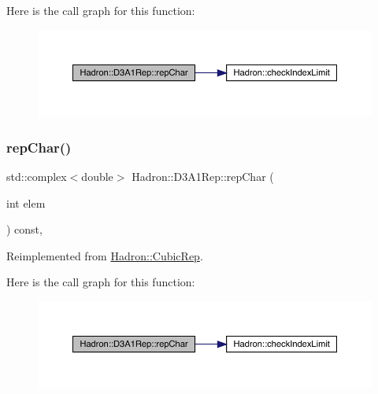 Here is the call graph for this function\+:
\nopagebreak
\begin{figure}[H]
\begin{center}
\leavevmode
\includegraphics[width=350pt]{d4/df6/structHadron_1_1D3A1Rep_aa169675bc42e174827e727a1f3571227_cgraph}
\end{center}
\end{figure}
\mbox{\label{structHadron_1_1D3A1Rep_aa169675bc42e174827e727a1f3571227}} 
\subsubsection{\texorpdfstring{repChar()}{repChar()}\hspace{0.1cm}{\footnotesize\ttfamily [2/2]}}
{\footnotesize\ttfamily std\+::complex$<$double$>$ Hadron\+::\+D3\+A1\+Rep\+::rep\+Char (\begin{DoxyParamCaption}\item[{int}]{elem }\end{DoxyParamCaption}) const\hspace{0.3cm}{\ttfamily [inline]}, {\ttfamily [virtual]}}



Reimplemented from \mbox{\hyperlink{structHadron_1_1CubicRep_af45227106e8e715e84b0af69cd3b36f8}{Hadron\+::\+Cubic\+Rep}}.

Here is the call graph for this function\+:
\nopagebreak
\begin{figure}[H]
\begin{center}
\leavevmode
\includegraphics[width=350pt]{d4/df6/structHadron_1_1D3A1Rep_aa169675bc42e174827e727a1f3571227_cgraph}
\end{center}
\end{figure}
\mbox{\label{structHadron_1_1D3A1Rep_a618d921105d92d30f7b3c838af644a74}} 
